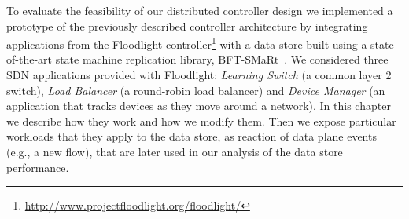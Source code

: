 \documentclass[12pt,openright,twoside]{report}
\title{\PEITITULO}
\author{\PEIAutor}
\begin{document}
\label{sec:feasibility:apps}
\glsresetall


To evaluate the feasibility of our distributed controller design we implemented a prototype of the previously described controller architecture by integrating applications from the Floodlight controller\footnote{\url{http://www.projectfloodlight.org/floodlight/}} with a data store built using a state-of-the-art state machine replication library, BFT-SMaRt~\cite{smart-tr}.
We considered three SDN applications provided with Floodlight: \emph{Learning Switch}  (a common layer 2 switch), \emph{Load   Balancer} (a round-robin load balancer) and \emph{Device Manager} (an application that tracks devices as they move around a network).
In this chapter we describe how they work and how we modify them. 
Then we expose particular workloads that they apply to the data store, as reaction of data plane events (e.g., a new flow), that are later used in our analysis of the data store performance.



\end{document}
